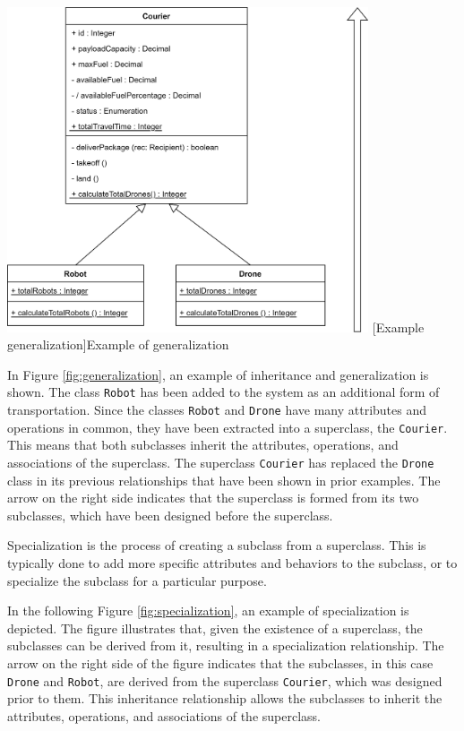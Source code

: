 \documentclass[
	12pt,
    a4paper,
    egregdoesnotlikesansseriftitles, %
    toc=chapterentrywithdots,
    oneside, openany,
    titlepage,
    parskip=half,
    headings=normal,  %
    listof=totoc,
    bibliography=totoc,
    index=totoc,
    captions=tableheading,  %
    listof=flat,
    numbers=noenddot, %
    final]
    {scrbook}
\begin{document}
\vspace{1em}
\begin{minipage}{\linewidth}
	\centering
	\includegraphics[width=0.8\textwidth]{figures/inheritance/generalization.jpg}
	[Example generalization]{Example of generalization}
	\label{fig:generalization}
\end{minipage}
\vspace{1em}

In Figure \ref{fig:generalization}, an example of inheritance and generalization is shown. 
The class \texttt{Robot} has been added to the system as an additional form of transportation. 
Since the classes \texttt{Robot} and \texttt{Drone} have many attributes and operations in common, they have been extracted into a superclass, the \texttt{Courier}.
This means that both subclasses inherit the attributes, operations, and associations of the superclass. 
The superclass \texttt{Courier} has replaced the \texttt{Drone} class in its previous relationships that have been shown in prior examples.
The arrow on the right side indicates that the superclass is formed from its two subclasses, which have been designed before the superclass.



Specialization is the process of creating a subclass from a superclass. This is typically done to add more specific attributes and behaviors to the subclass, or to specialize the subclass for a particular purpose.

In the following Figure \ref{fig:specialization}, an example of specialization is depicted. The figure illustrates that, given the existence of a superclass, the subclasses can be derived from it, resulting in a specialization relationship. 
The arrow on the right side of the figure indicates that the subclasses, in this case \texttt{Drone} and \texttt{Robot}, are derived from the superclass \texttt{Courier}, which was designed prior to them. 
This inheritance relationship allows the subclasses to inherit the attributes, operations, and associations of the superclass.
\end{document}
